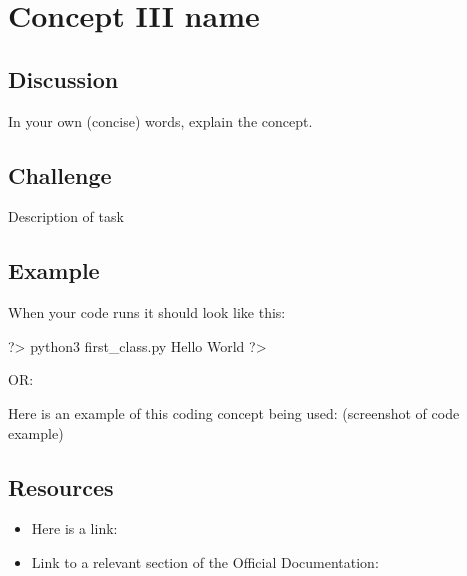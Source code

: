 \documentclass{42-en}
\begin{document}

\nextexercice
\chapter{Concept III name}

\section{Discussion}

In your own (concise) words, explain the concept.

\section{Challenge}


\makeheaderfiles
Description of task

\section{Example}
When your code runs it should look like this: 

\begin{42console}
	?> python3 first_class.py
	Hello World
	?>
\end{42console}

OR:

Here is an example of this coding concept being used: (screenshot of code example)


\section{Resources}
\begin{itemize}
	\item Here is a link:
    \item Link to a relevant section of the Official Documentation:
\end{itemize}
\end{document}
